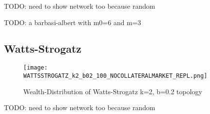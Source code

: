 \documentclass[Bachelorarbeit.tex]{subfiles}
\begin{document}
TODO: need to show network too because random

TODO: a barbasi-albert with m0=6 and m=3

\subsection{Watts-Strogatz}
\begin{figure}[H]
	\centering
  \texttt{[image: WATTSSTROGATZ\_k2\_b02\_100\_NOCOLLATERALMARKET\_REPL.png]}
	\caption{Wealth-Distribution of Watts-Strogatz k=2, b=0.2 topology}
	\label{fig1}
\end{figure}

TODO: need to show network too because random
\end{document}
